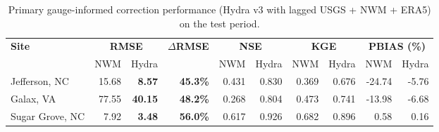 \begin{table}
\centering
\caption{Primary gauge-informed correction performance (Hydra v3 with lagged USGS + NWM + ERA5) on the test period.}
\small
\begin{tabular}{l rr r rr rr rr}
\toprule
\textbf{Site} & \multicolumn{2}{c}{\textbf{RMSE}} & \textbf{$\Delta$RMSE} & \multicolumn{2}{c}{\textbf{NSE}} & \multicolumn{2}{c}{\textbf{KGE}} & \multicolumn{2}{c}{\textbf{PBIAS (\%)}} \\
\cmidrule(lr){2-3}\cmidrule(lr){5-6}\cmidrule(lr){7-8}\cmidrule(lr){9-10}
 & NWM & Hydra & & NWM & Hydra & NWM & Hydra & NWM & Hydra \\
\midrule
Jefferson, NC & 15.68 & \textbf{8.57} & \textbf{45.3\%} & 0.431 & 0.830 & 0.369 & 0.676 & -24.74 & -5.76 \\
Galax, VA & 77.55 & \textbf{40.15} & \textbf{48.2\%} & 0.268 & 0.804 & 0.473 & 0.741 & -13.98 & -6.68 \\
Sugar Grove, NC & 7.92 & \textbf{3.48} & \textbf{56.0\%} & 0.617 & 0.926 & 0.682 & 0.896 & 0.58 & 0.16 \\
\bottomrule
\end{tabular}
\label{tab:primary_results}
\end{table}
